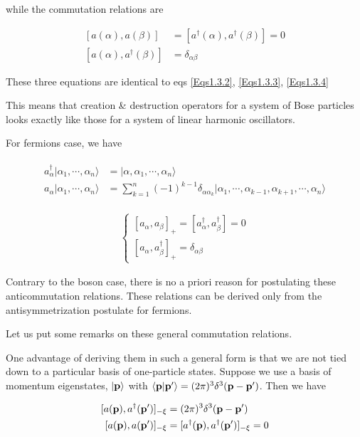 while the commutation relations are 

\begin{equation}
\begin{split}
[a(\alpha),a(\beta)] &= [a^\dagger(\alpha),a^\dagger(\beta)] = 0\\
[a(\alpha),a^\dagger(\beta)] &= \delta_{\alpha\beta}
\end{split}
\end{equation}

These three equations are identical to eqs \eqref{Eqs1.3.2}, \eqref{Eqs1.3.3}, \eqref{Eqs1.3.4}

This means that creation \& destruction operators for a system of Bose particles looks exactly like those for a system of linear harmonic oscillators. 

For fermions case, we have

\begin{align}
\begin{split}
a_\alpha^\dagger|\alpha_1,\cdots,\alpha_n\rangle &= |\alpha,\alpha_1,\cdots,\alpha_n\rangle\\
a_\alpha|\alpha_1,\cdots,\alpha_n\rangle &= \sum_{k=1}^n(-1)^{k-1}\delta_{\alpha\alpha_k}|\alpha_1,\cdots,\alpha_{k-1},\alpha_{k+1},\cdots,\alpha_n\rangle
\end{split}
\end{align}

\begin{align}
\begin{cases}
[a_\alpha,a_\beta]_+ = [a_\alpha^\dagger,a_\beta^\dagger] = 0\\
[a_\alpha,a_\beta^\dagger]_+ = \delta_{\alpha\beta}
\end{cases}
\end{align}

Contrary to the boson case, there is no a priori reason for  postulating these anticommutation relations. These relations can be derived only from the antisymmetrization postulate for fermions. 

Let us put some remarks on these general commutation relations. 

One advantage of deriving them in such a general form is that we are not tied down to a particular basis of one-particle states. Suppose we use a basis of momentum eigenstates, $|\bf p\rangle$ with $\langle{\bf p}|{\bf p'}\rangle = (2\pi)^3\delta^3({\bf p}-{\bf p'})$. Then we have

\begin{align}
\begin{split}
[a({\bf p}),a^\dagger({\bf p'})]_{-\xi}&=(2\pi)^3\delta^3({\bf p}-{\bf p'})\\
[a({\bf p}), a({\bf p'})]_{-\xi} &= [a^\dagger({\bf p}),a^\dagger({\bf p'})]_{-\xi} = 0
\end{split}
\end{align}

